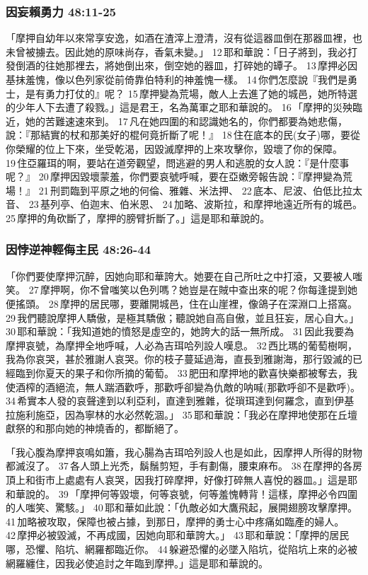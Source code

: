 \subsubsection{因妄賴勇力 48:11-25}
「摩押自幼年以來常享安逸，如酒在渣滓上澄清，沒有從這器皿倒在那器皿裡，也未曾被擄去。因此她的原味尚存，香氣未變。」 12 耶和華說：「日子將到，我必打發倒酒的往她那裡去，將她倒出來，倒空她的器皿，打碎她的罈子。 13 摩押必因基抹羞愧，像以色列家從前倚靠伯特利的神羞愧一樣。 14 你們怎麼說『我們是勇士，是有勇力打仗的』呢？ 15 摩押變為荒場，敵人上去進了她的城邑，她所特選的少年人下去遭了殺戮。」這是君王，名為萬軍之耶和華說的。 16 「摩押的災殃臨近，她的苦難速速來到。 17 凡在她四圍的和認識她名的，你們都要為她悲傷，說：『那結實的杖和那美好的棍何竟折斷了呢！』 18 住在底本的民(女子)哪，要從你榮耀的位上下來，坐受乾渴，因毀滅摩押的上來攻擊你，毀壞了你的保障。 19 住亞羅珥的啊，要站在道旁觀望，問逃避的男人和逃脫的女人說：『是什麼事呢？』 20 摩押因毀壞蒙羞，你們要哀號呼喊，要在亞嫩旁報告說：『摩押變為荒場！』 21 刑罰臨到平原之地的何倫、雅雜、米法押、 22 底本、尼波、伯低比拉太音、 23 基列亭、伯迦末、伯米恩、 24 加略、波斯拉，和摩押地遠近所有的城邑。 25 摩押的角砍斷了，摩押的膀臂折斷了。」這是耶和華說的。

\subsubsection{因悖逆神輕侮主民 48:26-44}
「你們要使摩押沉醉，因她向耶和華誇大。她要在自己所吐之中打滾，又要被人嗤笑。 27 摩押啊，你不曾嗤笑以色列嗎？她豈是在賊中查出來的呢？你每逢提到她便搖頭。 28 摩押的居民哪，要離開城邑，住在山崖裡，像鴿子在深淵口上搭窩。 29 我們聽說摩押人驕傲，是極其驕傲；聽說她自高自傲，並且狂妄，居心自大。」 30 耶和華說：「我知道她的憤怒是虛空的，她誇大的話一無所成。 31 因此我要為摩押哀號，為摩押全地呼喊，人必為吉珥哈列設人嘆息。 32 西比瑪的葡萄樹啊，我為你哀哭，甚於雅謝人哀哭。你的枝子蔓延過海，直長到雅謝海，那行毀滅的已經臨到你夏天的果子和你所摘的葡萄。 33 肥田和摩押地的歡喜快樂都被奪去，我使酒榨的酒絕流，無人踹酒歡呼，那歡呼卻變為仇敵的呐喊(那歡呼卻不是歡呼)。 34 希實本人發的哀聲達到以利亞利，直達到雅雜，從瑣珥達到何羅念，直到伊基拉施利施亞，因為寧林的水必然乾涸。」 35 耶和華說：「我必在摩押地使那在丘壇獻祭的和那向她的神燒香的，都斷絕了。

「我心腹為摩押哀鳴如簫，我心腸為吉珥哈列設人也是如此，因摩押人所得的財物都滅沒了。 37 各人頭上光禿，鬍鬚剪短，手有劃傷，腰束麻布。 38 在摩押的各房頂上和街市上處處有人哀哭，因我打碎摩押，好像打碎無人喜悅的器皿。」這是耶和華說的。 39 「摩押何等毀壞，何等哀號，何等羞愧轉背！這樣，摩押必令四圍的人嗤笑、驚駭。」 40 耶和華如此說：「仇敵必如大鷹飛起，展開翅膀攻擊摩押。 41 加略被攻取，保障也被占據，到那日，摩押的勇士心中疼痛如臨產的婦人。 42 摩押必被毀滅，不再成國，因她向耶和華誇大。」 43 耶和華說：「摩押的居民哪，恐懼、陷坑、網羅都臨近你。 44 躲避恐懼的必墜入陷坑，從陷坑上來的必被網羅纏住，因我必使追討之年臨到摩押。」這是耶和華說的。

